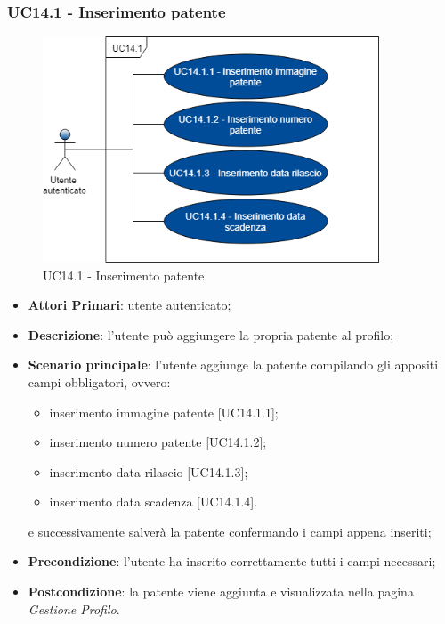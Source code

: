 \subsubsection{UC14.1 - Inserimento patente}
\begin{figure}[h]
	\includegraphics[width=10cm]{res/images/UC14-Patente.png}
	\centering
	\caption{UC14.1 - Inserimento patente}
\end{figure}
\begin{itemize}
	\item \textbf{Attori Primari}: utente autenticato;
	\item \textbf{Descrizione}: l'utente può aggiungere la propria patente al profilo;
	\item \textbf{Scenario principale}: l'utente aggiunge la patente compilando gli appositi campi obbligatori, ovvero:
	\begin{itemize}
		\item inserimento immagine patente [UC14.1.1];
		\item inserimento numero patente [UC14.1.2];
		\item inserimento data rilascio [UC14.1.3];
		\item inserimento data scadenza [UC14.1.4].
	\end{itemize}
	e successivamente salverà la patente confermando i campi appena inseriti;	 
	\item \textbf{Precondizione}: l'utente ha inserito correttamente tutti i campi necessari;
	\item \textbf{Postcondizione}: la patente viene aggiunta e visualizzata nella pagina \textit{Gestione Profilo}.
\end{itemize}
\newpage
